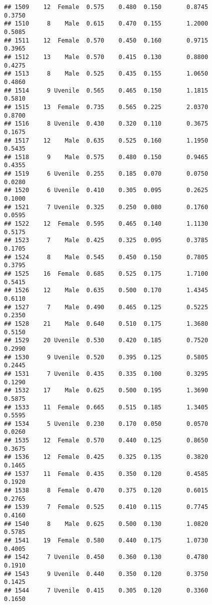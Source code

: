 \documentclass[
]{article}
\begin{document}
\begin{verbatim}
## 1509    12  Female  0.575    0.480  0.150       0.8745         0.3750
## 1510     8    Male  0.615    0.470  0.155       1.2000         0.5085
## 1511    12  Female  0.570    0.450  0.160       0.9715         0.3965
## 1512    13    Male  0.570    0.415  0.130       0.8800         0.4275
## 1513     8    Male  0.525    0.435  0.155       1.0650         0.4860
## 1514     9 Uvenile  0.565    0.465  0.150       1.1815         0.5810
## 1515    13  Female  0.735    0.565  0.225       2.0370         0.8700
## 1516     8 Uvenile  0.430    0.320  0.110       0.3675         0.1675
## 1517    12    Male  0.635    0.525  0.160       1.1950         0.5435
## 1518     9    Male  0.575    0.480  0.150       0.9465         0.4355
## 1519     6 Uvenile  0.255    0.185  0.070       0.0750         0.0280
## 1520     6 Uvenile  0.410    0.305  0.095       0.2625         0.1000
## 1521     7 Uvenile  0.325    0.250  0.080       0.1760         0.0595
## 1522    12  Female  0.595    0.465  0.140       1.1130         0.5175
## 1523     7    Male  0.425    0.325  0.095       0.3785         0.1705
## 1524     8    Male  0.545    0.450  0.150       0.7805         0.3795
## 1525    16  Female  0.685    0.525  0.175       1.7100         0.5415
## 1526    12    Male  0.635    0.500  0.170       1.4345         0.6110
## 1527     7    Male  0.490    0.465  0.125       0.5225         0.2350
## 1528    21    Male  0.640    0.510  0.175       1.3680         0.5150
## 1529    20 Uvenile  0.530    0.420  0.185       0.7520         0.2990
## 1530     9 Uvenile  0.520    0.395  0.125       0.5805         0.2445
## 1531     7 Uvenile  0.435    0.335  0.100       0.3295         0.1290
## 1532    17    Male  0.625    0.500  0.195       1.3690         0.5875
## 1533    11  Female  0.665    0.515  0.185       1.3405         0.5595
## 1534     5 Uvenile  0.230    0.170  0.050       0.0570         0.0260
## 1535    12  Female  0.570    0.440  0.125       0.8650         0.3675
## 1536    12  Female  0.425    0.325  0.135       0.3820         0.1465
## 1537    11  Female  0.435    0.350  0.120       0.4585         0.1920
## 1538     8  Female  0.470    0.375  0.120       0.6015         0.2765
## 1539     7  Female  0.525    0.410  0.115       0.7745         0.4160
## 1540     8    Male  0.625    0.500  0.130       1.0820         0.5785
## 1541    19  Female  0.580    0.440  0.175       1.0730         0.4005
## 1542     7 Uvenile  0.450    0.360  0.130       0.4780         0.1910
## 1543     9 Uvenile  0.440    0.350  0.120       0.3750         0.1425
## 1544     7 Uvenile  0.415    0.305  0.120       0.3360         0.1650

\end{verbatim}
\end{document}
